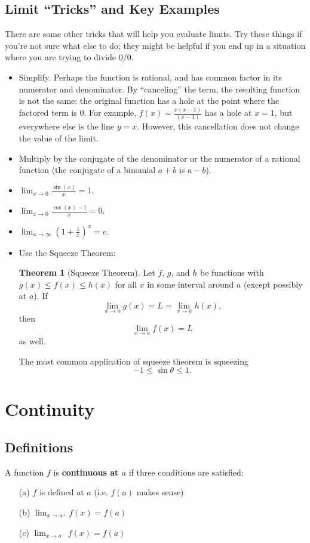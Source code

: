 \documentclass{article}
\theoremstyle{definition}
\newtheorem{theorem}{Theorem}[section]
\theoremstyle{definition}
\newenvironment{thm}[1][]{
\begin{tcolorbox}[colback=white!97!black, arc=0in]
\begin{theorem}[#1]
}{
\end{theorem}
\end{tcolorbox}
}
\begin{document}
\subsection{Limit ``Tricks'' and Key Examples}

There are some other tricks that will help you evaluate limits. Try these things if you're not sure what else to do; they might be helpful if you end up in a situation where you are trying to divide 0/0.
\begin{itemize}
\item Simplify. Perhaps the function is rational, and has common factor in its numerator and denominator. By ``canceling'' the term, the resulting function is not the same: the original function has a hole at the point where the factored term is 0. For example, $f(x)=\frac{x(x-1)}{(x-1)}$ has a hole at $x=1$, but everywhere else is the line $y=x$. However, this cancellation does not change the value of the limit.
\item Multiply by the conjugate of the denominator or the numerator of a rational function (the conjugate of a binomial $a+b$ is $a-b$).
\item $\displaystyle\lim_{x\to 0}\frac{\sin(x)}{x} = 1$.
\item $\displaystyle\lim_{x\to 0}\frac{\cos(x) - 1}{x} = 0$.
\item $\displaystyle\lim_{x\to\infty}\left(1+\frac{1}{x}\right)^x = e$.

\item Use the Squeeze Theorem:

\begin{thm}[Squeeze Theorem]
Let $f$, $g$, and $h$ be functions with $g(x)\leq f(x)\leq h(x)$ for all $x$ in some interval around $a$ (except possibly at $a$). If $$\lim_{x\to a}g(x)=L=\lim_{x\to a} h(x),$$ then $$\lim_{x\to a} f(x)=L$$
as well.
\end{thm}
The most common application of squeeze theorem is squeezing $$-1\leq \sin\theta \leq 1.$$
\end{itemize}


\section{Continuity}

\subsection{Definitions}

A function $f$ is \textbf{continuous at $a$} if three conditions are satisfied:
\begin{enumerate}
\item[(a)] $f$ is defined at $a$ (i.e. $f(a)$ makes sense)
\item[(b)] $\displaystyle\lim_{x\to a^+} f(x)= f(a)$
\item[(c)] $\displaystyle\lim_{x\to a^-} f(x)= f(a)$
\end{enumerate}
\end{document}
